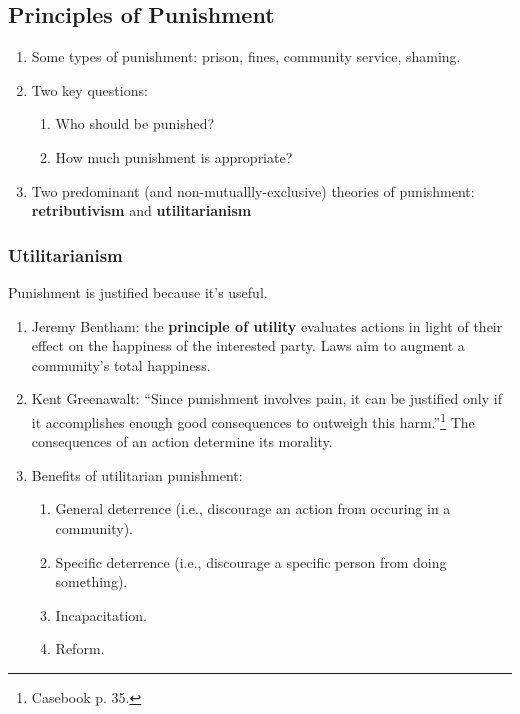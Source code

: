 \subsection{Principles of Punishment}

\begin{enumerate}
    \item Some types of punishment: prison, fines, community service, shaming.
    \item Two key questions:
    \begin{enumerate}
        \item Who should be punished?
        \item How much punishment is appropriate?
    \end{enumerate}
    \item Two predominant (and non-mutuallly-exclusive) theories of punishment: \textbf{retributivism} and \textbf{utilitarianism}
\end{enumerate}

\subsubsection{Utilitarianism}

Punishment is justified because it's useful.

\begin{enumerate}
    \item Jeremy Bentham: the \textbf{principle of utility} evaluates actions in light of their effect on the happiness of the interested party. Laws aim to augment a community's total happiness.
    \item Kent Greenawalt: ``Since punishment involves pain, it can be justified only if it accomplishes enough good consequences to outweigh this harm.''\footnote{Casebook p. 35.} The consequences of an action determine its morality.
    \item Benefits of utilitarian punishment:
    \begin{enumerate}
        \item General deterrence (i.e., discourage an action from occuring in a community).
        \item Specific deterrence (i.e., discourage a specific person from doing something).
        \item Incapacitation.
        \item Reform.
    \end{enumerate}
\end{enumerate}

